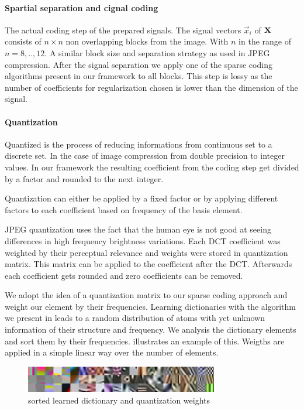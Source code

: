 \paragraph{Spartial separation and cignal coding}
The actual coding step of the prepared signals. The signal vectors $\vec{x}_i$
of $\boldsymbol{\mathrm{X}}$ consists of $n \times n$ non overlapping blocks from the image.
With $n$ in the range of $n=8,..,12$. A similar block size and separation
strategy as used in JPEG compression. After the signal separation we apply one
of the sparse coding algorithms present in our framework to all blocks. This
step is lossy as the number of coefficients for regularization chosen is lower
than the dimension of the signal. 

\paragraph{Quantization}
Quantized is the process of reducing informations from continuous set to a
discrete set. In the case of image compression from double precision to integer
values. In our framework the resulting coefficient from the coding step get
divided by a factor and rounded to the next integer.  

Quantization can either be applied by a fixed factor or by applying different 
factors to each coefficient based on frequency of the basis element.

JPEG quantization uses the fact that the human eye is not good at seeing
differences in high frequency brightness variations. Each DCT coefficient was
weighted by their perceptual relevance and weights were stored in quantization
matrix. This matrix can be applied to the coefficient after the DCT. 
Afterwards each coefficient gets rounded and zero coefficients can be removed.

We adopt the idea of a quantization matrix to our sparse coding approach and
weight our element by their frequencies. Learning dictionaries with the
algorithm we present in  leads to a random distribution of
atoms with yet unknown information of their structure and frequency. We analysis
the dictionary elements and sort them by their frequencies.
 illustrates an example of this. Weigths are applied
in a simple linear way over the number of elements.

\begin{figure}[h]
\centering
\includegraphics[width = 0.75\textwidth]{images/sorted.png}
\caption{sorted learned dictionary and quantization weights}
\label{fig:sorted}
\end{figure}

